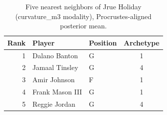 \begin{table}[htbp]
  \centering\small
  \begin{tabular}{rllc}
    \toprule
    Rank & Player & Position & Archetype \\
    \midrule
    1 & Dalano Banton & G & 1 \\
    2 & Jamaal Tinsley & G & 4 \\
    3 & Amir Johnson & F & 1 \\
    4 & Frank Mason III & G & 1 \\
    5 & Reggie Jordan & G & 4 \\
    \bottomrule
  \end{tabular}
  \caption{Five nearest neighbors of Jrue Holiday (curvature_m3 modality), Procrustes-aligned posterior mean.}
  \label{tab:Jrue_Holiday_neighbors_curvature_m3}
\end{table}

